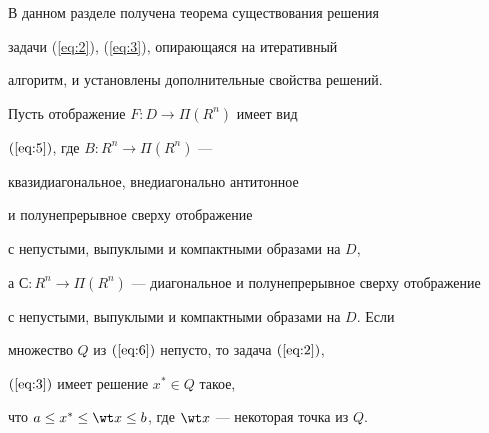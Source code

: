 В данном разделе получена теорема существования решения


задачи (\ref{eq:2}), (\ref{eq:3}), опирающаяся на итеративный


алгоритм, и установлены дополнительные свойства решений.











\begin{thms}\label{thm:2}


Пусть отображение $F: D \to \Pi (R^{n})$ имеет вид


$(\ref{eq:5})$, где $B: R^n \to \Pi (R^n)$ ---


квазидиагональное, внедиагонально антитонное


и полунепрерывное сверху отображение


с непустыми, выпуклыми и компактными образами на $D$,


а $С: R^n \to \Pi (R^n)$ --- диагональное и полунепрерывное сверху отображение


с непустыми, выпуклыми и компактными образами на $D$. Если


множество $Q$ из $(\ref{eq:6})$ непусто, то задача $(\ref{eq:2})$,


$(\ref{eq:3})$ имеет решение $x^* \in Q$ такое,


что $a \le x^* \le \wt x \le b$, где $\wt x$ --- некоторая точка из $Q$.


\end{thms}








